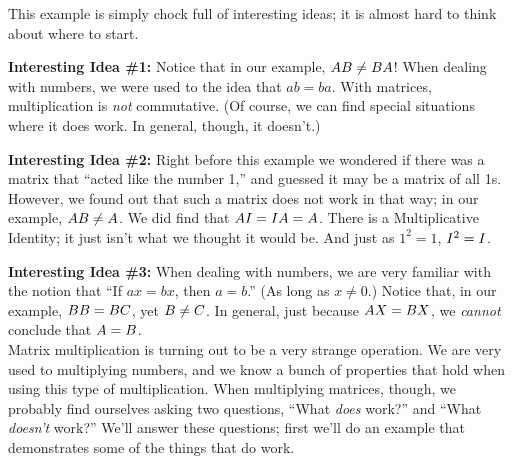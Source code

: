 This example is simply chock full of interesting ideas; it is almost hard to think about where to start. 

\textsf{\textbf{Interesting Idea \#1:}} Notice that in our example, $AB \neq BA$! When dealing with numbers, we were used to the idea that $ab = ba$. With matrices, multiplication is \textit{not} commutative. (Of course, we can find special situations where it does work. In general, though, it doesn't.)

\textsf{\textbf{Interesting Idea \#2:}} Right before this example we wondered if there was a matrix that ``acted like the number 1,'' and guessed it may be a matrix of all 1s. %
However, we found out that such a matrix does not work in that way; in our example, $AB \neq A$. We did find that $AI = IA = A$. There is a Multiplicative Identity; it just isn't what we thought it would be. And just as $1^2 = 1$, $I^2 = I$.

\textsf{\textbf{Interesting Idea \#3:}} When dealing with numbers, we are very familiar with the notion that ``If $ax = bx$, then $a=b$.'' (As long as $x\neq 0$.) Notice that, in our example, $BB = BC$, yet $B\neq C$. In general, just because $AX = BX$, we \textit{cannot} conclude that $A =B$.\\

Matrix multiplication is turning out to be a very strange operation. We are very used to multiplying numbers, and we know a bunch of properties that hold when using this type of multiplication. When multiplying matrices, though, we probably find ourselves asking two questions, ``What \textit{does} work?'' and ``What \textit{doesn't} work?'' We'll answer these questions; first we'll do an example that demonstrates some of the things that do work.\\


